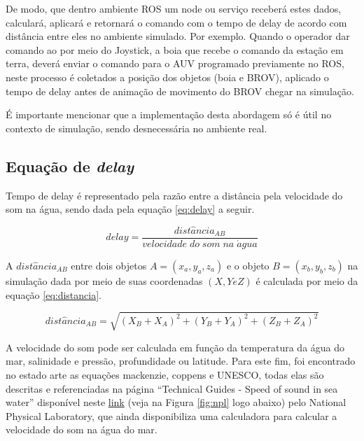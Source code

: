 De modo, que dentro ambiente ROS um node ou serviço receberá estes dados, calculará, aplicará e retornará o comando com o tempo de delay de acordo com distância entre eles no ambiente simulado. Por exemplo. Quando o operador dar comando ao por meio do Joystick,  a boia que recebe o comando da estação em terra, deverá enviar o comando para o AUV programado previamente no ROS, neste processo é coletados a posição dos objetos (boia e BROV), aplicado o tempo de delay antes de animação de movimento do BROV chegar na simulação.

É importante mencionar que a implementação desta abordagem só é útil no contexto de simulação, sendo desnecessária no ambiente real.

\subsection{Equação de \textit{delay}}

Tempo de delay é representado pela razão entre a distância pela velocidade do som na água, sendo dada pela equação \ref{eq:delay} a seguir.

\begin{equation}
	delay = \dfrac{dist\hat{a}ncia_{AB}}{velocidade\;do\;som\;na\;\acute{a}gua}
	\label{eq:delay}
\end{equation}

A $dist\hat{a}ncia_{AB}$ entre dois objetos $A = (x_a,y_a,z_a)$ e o objeto $B = (x_b,y_b,z_b)$ na simulação dada por meio de suas coordenadas $(X, Y e Z)$ é calculada por meio da equação \ref{eq:distancia}. 

\begin{equation}
	dist\hat{a}ncia_{AB} = \sqrt{(X_B + X_A)^2 + (Y_B + Y_A)^2 + (Z_B + Z_A)^2}
	\label{eq:distancia}
\end{equation}

A velocidade do som pode ser calculada em função da temperatura da água do mar, salinidade e pressão, profundidade ou latitude. Para este fim, foi encontrado no estado arte as equações mackenzie, coppens e UNESCO, todas elas são descritas e referenciadas na página “Technical Guides - Speed of sound in sea water” disponível neste \href{http://resource.npl.co.uk/acoustics/techguides/soundseawater/index.html}{link} (veja na Figura \ref{fig:npl} logo abaixo)  pelo National Physical Laboratory, que ainda disponibiliza uma calculadora para calcular a velocidade do som na água do mar.

